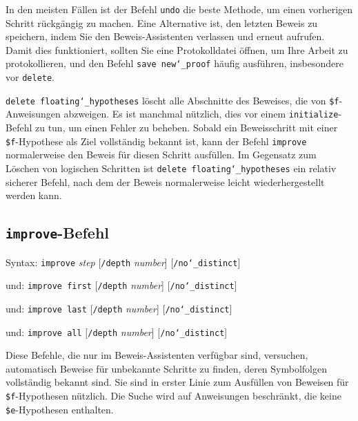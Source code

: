 In den meisten Fällen ist der Befehl \texttt{undo} die beste Methode, um einen vorherigen Schritt rückgängig zu machen. Eine Alternative ist, den letzten Beweis zu speichern, indem Sie den Beweis-Assistenten verlassen und erneut aufrufen. Damit dies funktioniert, sollten Sie eine Protokolldatei öffnen, um Ihre Arbeit zu protokollieren, und den Befehl \texttt{save new{\char`\_}proof} häufig ausführen, insbesondere vor \texttt{delete}. 

\texttt{delete floating{\char`\_}hypotheses} löscht alle Abschnitte des Beweises, die von \texttt{\$f}-Anweisungen abzweigen.  Es ist manchmal nützlich, dies vor einem \texttt{initialize}-Befehl zu tun, um einen Fehler zu beheben.  Sobald ein Beweis\-schritt mit einer \texttt{\$f}-Hypothese als Ziel vollständig bekannt ist, kann der Befehl \texttt{improve} normalerweise den Beweis für diesen Schritt ausfüllen.  Im Gegensatz zum Löschen von logischen Schritten ist \texttt{delete floating{\char`\_}hypotheses} ein relativ sicherer Befehl, nach dem der Beweis normalerweise leicht wiederhergestellt werden kann. 


\subsection{\texttt{improve}-Befehl}
\label{improve}

Syntax:  \texttt{improve} {\em step} [\texttt{/depth} {\em number}]
                                               [\texttt{/no{\char`\_}distinct}]

   und:   \texttt{improve first} [\texttt{/depth} {\em number}]
                                              [\texttt{/no{\char`\_}distinct}]

   und:   \texttt{improve last} [\texttt{/depth} {\em number}]
                                              [\texttt{/no{\char`\_}distinct}]

   und:   \texttt{improve all} [\texttt{/depth} {\em number}]
                                              [\texttt{/no{\char`\_}distinct}]

Diese Befehle, die nur im Beweis-Assistenten verfügbar sind, versuchen, automatisch Beweise für unbekannte Schritte zu finden, deren Symbolfolgen vollständig bekannt sind.  Sie sind in erster Linie zum Ausfüllen von Beweisen für \texttt{\$f}-Hypothesen nützlich.  Die Suche wird auf Anweisungen beschränkt, die keine \texttt{\$e}-Hypothesen enthalten. 

